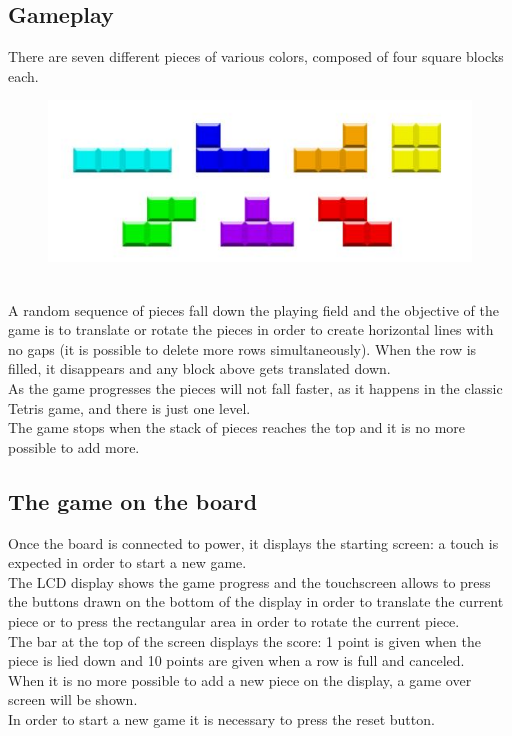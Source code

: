 \documentclass[18pt,oneside,a4paper, titlepage]{article}
\begin{document}
	\subsection{Gameplay}
		There are seven different pieces of various colors, composed of four square blocks each.\\
		\begin{figure}[h]
			\centering
			\includegraphics[scale=0.7]{blocks.jpg}
		\end{figure}
		\\
		A random sequence of pieces fall down the playing field and the objective of the game is to translate or rotate the pieces in order to create horizontal lines with no gaps (it is possible to delete more rows simultaneously). When the row is filled, it disappears and any block above gets translated down.\\
		As the game progresses the pieces will not fall faster, as it happens in the classic Tetris game, and there is just one level.\\The game stops when the stack of pieces reaches the top and it is no more possible to add more. 
	\subsection{The game on the board}
		Once the board is connected to power, it displays the starting screen: a touch is expected in order to start a new game.\\
		The LCD display shows the game progress and the touchscreen allows to press the buttons drawn on the bottom of the display in order to translate the current piece or to press the rectangular area in order to rotate the current piece.\\
		The bar at the top of the screen displays the score: 1 point is given when the piece is lied down and 10 points are given when a row is full and canceled.\\
		When it is no more possible to add a new piece on the display, a game over screen will be shown.\\
		In order to start a new game it is necessary to press the reset button.
\newpage
\end{document}
